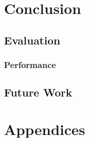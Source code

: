 \documentclass{UoYCSproject}
\begin{document}


\chapter{Conclusion}

\section{Evaluation}




\subsection{Performance}


\section{Future Work}




\chapter{Appendices}
\end{document}
